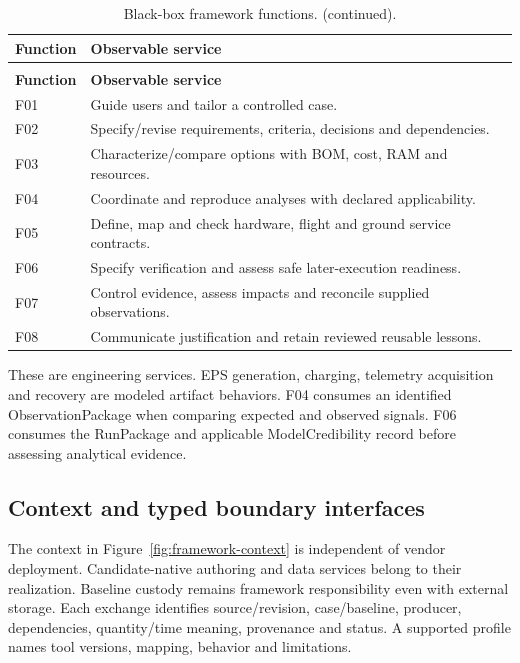 {\small
\setlength{\tabcolsep}{4pt}
\setlength{\parskip}{0pt}
\setlength{\LTpre}{0.4\baselineskip}
\setlength{\LTpost}{0.4\baselineskip}
\renewcommand{\arraystretch}{1.06}
\begin{longtable}{@{}>{\raggedright\arraybackslash}p{}>{\raggedright\arraybackslash}p{}@{}}
\caption{Black-box framework functions.}\label{tab:framework-functions}\\
\toprule
\textbf{Function} & \textbf{Observable service} \\
\midrule
\endfirsthead
\caption[]{Black-box framework functions. (continued).}\\
\toprule
\textbf{Function} & \textbf{Observable service} \\
\midrule
\endhead
\bottomrule
\endfoot
F01 & Guide users and tailor a controlled case. \\
F02 & Specify/revise requirements, criteria, decisions and dependencies. \\
F03 & Characterize/compare options with BOM, cost, RAM and resources. \\
F04 & Coordinate and reproduce analyses with declared applicability. \\
F05 & Define, map and check hardware, flight and ground service contracts. \\
F06 & Specify verification and assess safe later-execution readiness. \\
F07 & Control evidence, assess impacts and reconcile supplied observations. \\
F08 & Communicate justification and retain reviewed reusable lessons. \\
\end{longtable}
}

These are engineering services. EPS generation, charging, telemetry acquisition and recovery are modeled artifact behaviors. F04 consumes an identified ObservationPackage when comparing expected and observed signals. F06 consumes the RunPackage and applicable ModelCredibility record before assessing analytical evidence.

\subsection{Context and typed boundary interfaces}
\label{subsection:framework-context}

The context in Figure~\ref{fig:framework-context} is independent of vendor deployment. Candidate-native authoring and data services belong to their realization. Baseline custody remains framework responsibility even with external storage. Each exchange identifies source/revision, case/baseline, producer, dependencies, quantity/time meaning, provenance and status. A supported profile names tool versions, mapping, behavior and limitations.


